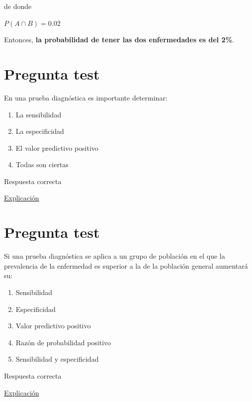 \documentclass[
]{book}
\providecommand{\tightlist}{%
  \setlength{\itemsep}{0pt}\setlength{\parskip}{0pt}}
\begin{document}
de donde

\(P(A \cap B)=0.02\)

Entonces, \textbf{la probabilidad de tener las dos enfermedades es del 2\%}.

\hypertarget{pregunta-test-162}{%
\section{Pregunta test}\label{pregunta-test-162}}

En una prueba diagnóstica es importante determinar:

\begin{enumerate}
\def\labelenumi{\alph{enumi})}
\tightlist
\item
  La sensibilidad
\item
  La especificidad
\item
  El valor predictivo positivo
\item
  Todas son ciertas
\end{enumerate}

Respuesta correcta

\href{https://1fjmanzano.github.io/bioestadistica/relaci\%C3\%B3n-entre-variables-cualitativas.html\#diagno\%CC\%81stico-cli\%CC\%81nico}{Explicación}

\hypertarget{pregunta-test-163}{%
\section{Pregunta test}\label{pregunta-test-163}}

Si una prueba diagnóstica se aplica a un grupo de población en el que la prevalencia de la enfermedad es superior a la de la población general aumentará su:

\begin{enumerate}
\def\labelenumi{\alph{enumi})}
\tightlist
\item
  Sensibilidad
\item
  Especificidad
\item
  Valor predictivo positivo
\item
  Razón de probabilidad positivo
\item
  Sensibilidad y especificidad
\end{enumerate}

Respuesta correcta

\href{https://1fjmanzano.github.io/bioestadistica/relaci\%C3\%B3n-entre-variables-cualitativas.html\#diagno\%CC\%81stico-cli\%CC\%81nico}{Explicación}
\end{document}
